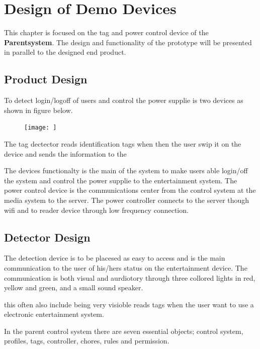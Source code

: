 \chapter{Design of Demo Devices}
This chapter is focused on the tag and power control device of the \textbf{Parentsystem}. 
The design and functionality of the prototype will be presented in parallel to the designed end product.
\section{Product Design}
To detect login/logoff of users and control the power supplie is two devices as shown in figure below.

\begin{figure}
	\centering
		\texttt{[image: ]}
\end{figure}

The tag dectector reads identification tags when then the user swip it on the device and sends the information to the  

The devices functionalty is the main of the system to make users able login/off the system and control the power supplie to the entertainment system. The power control device is the communications center from the control system at the media system to the server. The power controller connects to the server though wifi and to reader device through low frequency connection. 


\section{Detector Design}

The detection device is to be placesed as easy to access and is the main communication to the user of his/hers status on the entertainment device.
The communication is both visual and aurdiotory through three collored lights in red, yellow and green, and a small sound speaker.









  

   this often also include being very visioble    reads tags when the user want to use a electronic entertainment system.    


In the parent control system there are seven essential objects; control system, profiles, tags, controller, chores, rules and permission. 


